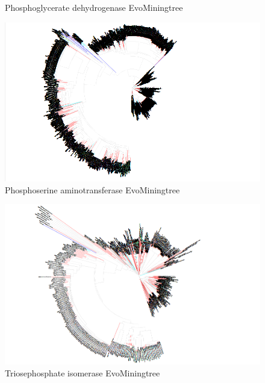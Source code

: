 \documentclass[12pt,twoside]{reedthesis}
\begin{document}
\begin{figure}[h!tbp]
  \caption[Phosphoglycerate dehydrogenase EvoMiningtree]{\normalsize{Phosphoglycerate dehydrogenase EvoMiningtree}}
  \label{fig:Phosphoglycerate_dehydrogenase_evo_tree}
  \end{figure}\begin{figure}[h!tbp]
  \centering
  \includegraphics[angle = 180,scale = 0.25]{chapter5/tree2.png}
  \caption[Phosphoserine aminotransferase EvoMiningtree]{\normalsize{Phosphoserine aminotransferase EvoMiningtree}}
  \label{fig:Phosphoserine_aminotransferase_evo_tree}
  \end{figure}\begin{figure}[h!tbp]
  \centering
  \includegraphics[angle = 180,scale = 0.25]{chapter5/tree10.png}
  \caption[Triosephosphate isomerase EvoMiningtree]{\normalsize{Triosephosphate isomerase EvoMiningtree}}
  \label{fig:Triosephosphate_isomerase_evo_tree}
  \end{figure}\begin{figure}[h!tbp]
  \centering

\end{figure}
\end{document}
